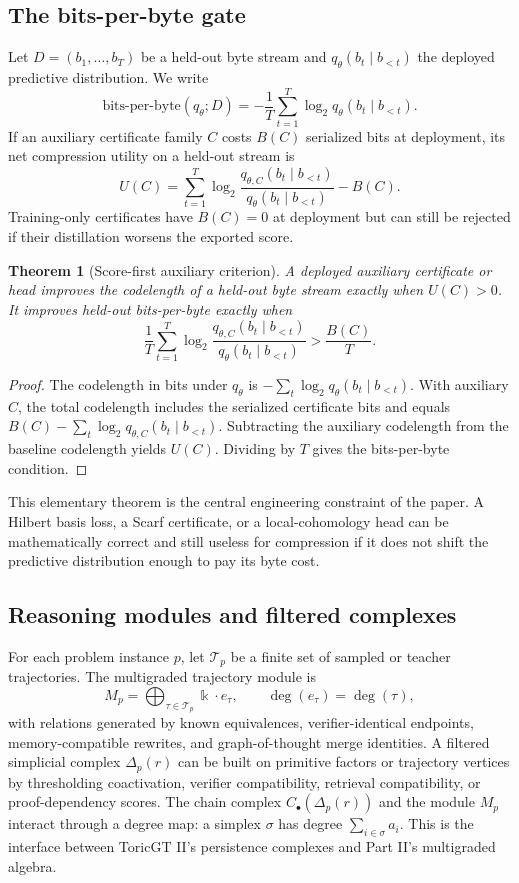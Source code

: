\documentclass[11pt]{article}
\newtheorem{theorem}{Theorem}[section]
\theoremstyle{definition}
\newcommand{\kk}{\Bbbk}
\begin{document}
\subsection{The bits-per-byte gate}
Let \(D=(b_1,\ldots,b_T)\) be a held-out byte stream and \(q_\theta(b_t\mid b_{<t})\) the deployed predictive distribution.  We write
\[
\mathrm{bits\text{-}per\text{-}byte}(q_\theta;D)=
-\frac{1}{T}\sum_{t=1}^T\log_2 q_\theta(b_t\mid b_{<t}).
\]
If an auxiliary certificate family \(C\) costs \(B(C)\) serialized bits at deployment, its net compression utility on a held-out stream is
\[
U(C)=\sum_{t=1}^T \log_2\frac{q_{\theta,C}(b_t\mid b_{<t})}{q_{\theta}(b_t\mid b_{<t})}-B(C).
\]
Training-only certificates have \(B(C)=0\) at deployment but can still be rejected if their distillation worsens the exported score.

\begin{theorem}[Score-first auxiliary criterion]
A deployed auxiliary certificate or head improves the codelength of a held-out byte stream exactly when \(U(C)>0\).  It improves held-out bits-per-byte exactly when
\[
\frac{1}{T}\sum_{t=1}^T \log_2\frac{q_{\theta,C}(b_t\mid b_{<t})}{q_{\theta}(b_t\mid b_{<t})} > \frac{B(C)}{T}.
\]
\end{theorem}
\begin{proof}
The codelength in bits under \(q_\theta\) is \(-\sum_t\log_2 q_\theta(b_t\mid b_{<t})\).  With auxiliary \(C\), the total codelength includes the serialized certificate bits and equals \(B(C)-\sum_t\log_2 q_{\theta,C}(b_t\mid b_{<t})\).  Subtracting the auxiliary codelength from the baseline codelength yields \(U(C)\).  Dividing by \(T\) gives the bits-per-byte condition.
\end{proof}

This elementary theorem is the central engineering constraint of the paper.  A Hilbert basis loss, a Scarf certificate, or a local-cohomology head can be mathematically correct and still useless for compression if it does not shift the predictive distribution enough to pay its byte cost.

\subsection{Reasoning modules and filtered complexes}
For each problem instance \(p\), let \(\mathcal{T}_p\) be a finite set of sampled or teacher trajectories.  The multigraded trajectory module is
\[
M_p=\bigoplus_{\tau\in\mathcal{T}_p}\kk\cdot e_\tau,
\qquad \deg(e_\tau)=\deg(\tau),
\]
with relations generated by known equivalences, verifier-identical endpoints, memory-compatible rewrites, and graph-of-thought merge identities.  A filtered simplicial complex \(\Delta_p(r)\) can be built on primitive factors or trajectory vertices by thresholding coactivation, verifier compatibility, retrieval compatibility, or proof-dependency scores.  The chain complex \(C_\bullet(\Delta_p(r))\) and the module \(M_p\) interact through a degree map: a simplex \(\sigma\) has degree \(\sum_{i\in\sigma}a_i\).  This is the interface between ToricGT II's persistence complexes and Part II's multigraded algebra.
\end{document}
